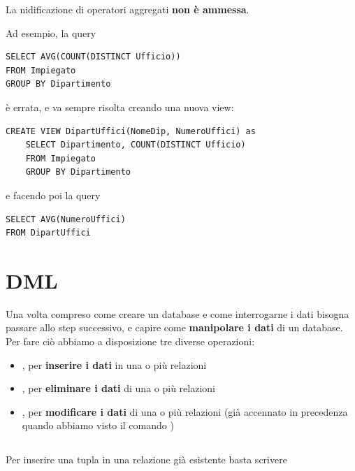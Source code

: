 \documentclass[11pt, a4paper, titlepage, oneside]{scrbook}
\begin{document}
\begin{Proposizione}[]
\label{propos-nidificazione-2}
La nidificazione di operatori aggregati \textbf{non è ammessa}.
\end{Proposizione}

Ad esempio, la query

\begin{lstlisting}
SELECT AVG(COUNT(DISTINCT Ufficio))
FROM Impiegato 
GROUP BY Dipartimento
\end{lstlisting}

è errata, e va sempre risolta creando una nuova view:

\begin{lstlisting}
CREATE VIEW DipartUffici(NomeDip, NumeroUffici) as
    SELECT Dipartimento, COUNT(DISTINCT Ufficio)
    FROM Impiegato
    GROUP BY Dipartimento
\end{lstlisting}

e facendo poi la query

\begin{lstlisting}
SELECT AVG(NumeroUffici)
FROM DipartUffici
\end{lstlisting}

\section{DML}

Una volta compreso come creare un database e come interrogarne i dati bisogna passare allo step successivo, e capire come \textbf{manipolare i dati} di un database. Per fare ciò abbiamo a disposizione tre diverse operazioni:
\begin{itemize}
    \item {}, per \textbf{inserire i dati} in una o più relazioni
    \item {}, per \textbf{eliminare i dati} di una o più relazioni
    \item {}, per \textbf{modificare i dati} di una o più relazioni (già accennato in precedenza quando abbiamo visto il comando )
\end{itemize}

\subsection*{}

Per inserire una tupla  in una relazione  già esistente basta scrivere
\end{document}
